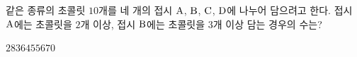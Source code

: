 같은 종류의 초콜릿 $10$개를 네 개의 접시 $\mathrm{A}$, $\mathrm{B}$, $\mathrm{C}$, $\mathrm{D}$에 나누어 담으려고 한다. 접시 $\mathrm{A}$에는 초콜릿을 $2$개 이상, 접시 $\mathrm{B}$에는 초콜릿을 $3$개 이상 담는 경우의 수는? 
\begin{choices32}{$28$}{$36$}{$45$}{$56$}{$70$}\end{choices32}
